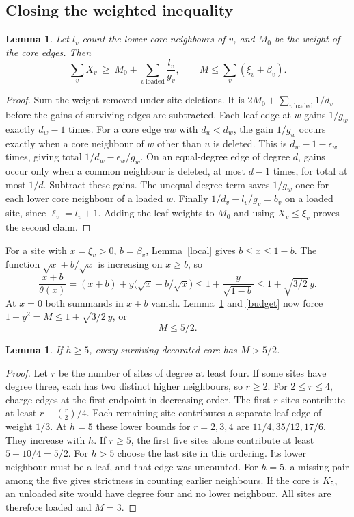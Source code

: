 \documentclass[11pt,a4paper]{article}
\newtheorem{lemma}[theorem]{Lemma}
\theoremstyle{remark}\newtheorem*{remark}{Remark}
\begin{document}
\subsection{Closing the weighted inequality}\label{sec:hand}
\begin{lemma}\label{saved}
Let $l_v$ count the lower \emph{core} neighbours of $v$, and $M_0$ be the weight of the core edges. Then
\[
 \sum_v X_v\ \ge\ M_0+\sum_{v\ \mathrm{loaded}}\frac{l_v}{g_v},
 \qquad M\le\sum_v(\xi_v+\beta_v).
\]
\end{lemma}
\begin{proof}
Sum the weight removed under site deletions. It is $2M_0+\sum_{v\ \mathrm{loaded}}1/d_v$ before the gains of surviving edges are subtracted. Each leaf edge at $w$ gains $1/g_w$ exactly $d_w-1$ times. For a core edge $uw$ with $d_u<d_w$, the gain $1/g_w$ occurs exactly when a core neighbour of $w$ other than $u$ is deleted. This is $d_w-1-\epsilon_w$ times, giving total $1/d_w-\epsilon_w/g_w$. On an equal-degree edge of degree $d$, gains occur only when a common neighbour is deleted, at most $d-1$ times, for total at most $1/d$. Subtract these gains. The unequal-degree term saves $1/g_w$ once for each lower core neighbour of a loaded $w$. Finally $1/d_v-l_v/g_v=b_v$ on a loaded site, since $\ell_v=l_v+1$. Adding the leaf weights to $M_0$ and using $X_v\le\xi_v$ proves the second claim.
\end{proof}
For a site with $x=\xi_v>0$, $b=\beta_v$, Lemma~\ref{local} gives $b\le x\le1-b$. The function $\sqrt{x}+b/\sqrt{x}$ is increasing on $x\ge b$, so
\[
 \frac{x+b}{\theta(x)}
   =(x+b)+y\bigl(\sqrt{x}+b/\sqrt{x}\bigr)
   \le1+\frac{y}{\sqrt{1-b}}\le1+\sqrt{3/2}\,y .
\]
At $x=0$ both summands in $x+b$ vanish. Lemma~\ref{saved} and \eqref{budget} now force $1+y^2=M\le1+\sqrt{3/2}\,y$, or
\begin{equation}M\le 5/2.\label{fivehalf}\end{equation}
\begin{lemma} If $h\ge5$, every surviving decorated core has $M>5/2$.\end{lemma}
\begin{proof}
Let $r$ be the number of sites of degree at least four. If some sites have degree three, each has two distinct higher neighbours, so $r\ge2$. For $2\le r\le4$, charge edges at the first endpoint in decreasing order. The first $r$ sites contribute at least $r-\binom r2/4$. Each remaining site contributes a separate leaf edge of weight $1/3$. At $h=5$ these lower bounds for $r=2,3,4$ are $11/4,35/12,17/6$. They increase with $h$. If $r\ge5$, the first five sites alone contribute at least $5-10/4=5/2$. For $h>5$ choose the last site in this ordering. Its lower neighbour must be a leaf, and that edge was uncounted. For $h=5$, a missing pair among the five gives strictness in counting earlier neighbours. If the core is $K_5$, an unloaded site would have degree four and no lower neighbour. All sites are therefore loaded and $M=3$.
\end{proof}
\end{document}
